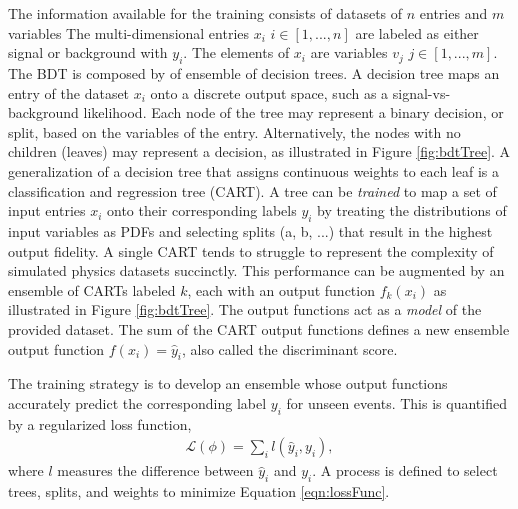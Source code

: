 The information available for the training consists of datasets of $n$ entries and $m$ variables
The multi-dimensional entries $x_i$ $i\in[1,...,n]$ are labeled as either signal or background with $y_i$.
The elements of $x_i$ are variables $v_j$ $j\in[1,...,m]$.
The BDT is composed by of ensemble of decision trees.
A decision tree maps an entry of the dataset $x_i$ onto a discrete output space, such as a signal-vs-background likelihood.
Each node of the tree may represent a binary decision, or split, based on the variables of the entry.
Alternatively, the nodes with no children (leaves) may represent a decision, as illustrated in Figure \ref{fig:bdtTree}.
A generalization of a decision tree that assigns continuous weights to each leaf is a classification and regression tree (CART).
A tree can be \emph{trained} to map a set of input entries $x_i$ onto their corresponding labels $y_i$ by treating the distributions of input variables as PDFs and selecting splits (a, b, ...) that result in the highest output fidelity.
A single CART tends to struggle to represent the complexity of simulated physics datasets succinctly.
This performance can be augmented by an ensemble of CARTs labeled $k$, each with an output function $f_k(x_i)$ as illustrated in Figure \ref{fig:bdtTree}.
The output functions act as a \emph{model} of the provided dataset.
The sum of the CART output functions defines a new ensemble output function $f(x_i)=\hat{y}_i$, also called the discriminant score.

The training strategy is to develop an ensemble whose output functions accurately predict the corresponding label $y_i$ for unseen events.
This is quantified by a regularized loss function,
\begin{equation}\begin{split}\label{eqn:lossFunc}
    \mathcal{L}(\phi)=\sum_i l(\hat{y}_i,y_i),
\end{split}\end{equation} 
where $l$ measures the difference between $\hat{y}_i$ and $y_i$.
A process is defined to select trees, splits, and weights to minimize Equation \ref{eqn:lossFunc}.

